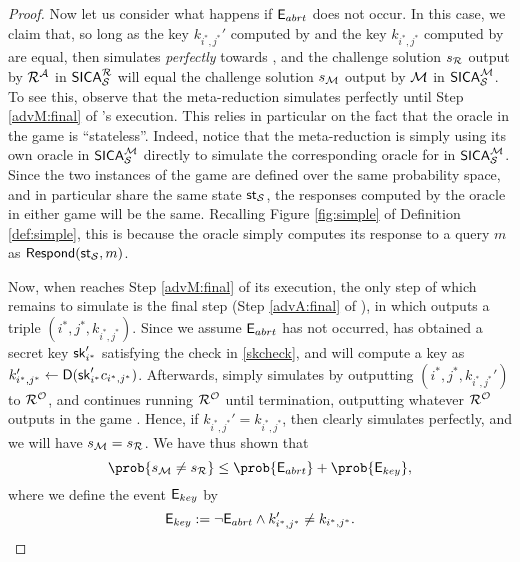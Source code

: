 \begin{proof}
  Now let us consider what happens if \(\mathsf{E}_{abrt}\) does not occur.
  In this case, we claim that, so long as the key
  \(k_{i^{*},j^{*}}'\) computed by \redM
  and the key \(k_{i^{*},j^{*}}\) computed by \advA
  are equal,
  then \redM simulates \advA \emph{perfectly}
  towards \redR,
  and the challenge solution \(s_{\redR}\) output by \(\redR^{\advA}\) in \(\SICA_{\Simple}^{\redR}\)
  will equal the challenge solution \(s_{\mathcal{M}}\) output by \(\mathcal{M}\)
  in \(\mathsf{SICA}_{\mathcal{S}}^{\mathcal{M}}\).
  To see this, observe that the meta-reduction \redM simulates \advA
  perfectly until Step \ref{advM:final} of \redM's execution.
  This relies in particular on the fact that the oracle \oracle
  in the \SICA game is ``stateless''.
  Indeed, notice that the meta-reduction \redM is simply
  using its own oracle \oracle in \(\mathsf{SICA}_{\mathcal{S}}^{\mathcal{M}}\)
  directly to simulate the corresponding oracle for \redR in \(\mathsf{SICA}_{\mathcal{S}}^{\mathcal{M}}\).
  Since the two instances of the \SICA game are defined over the same probability space,
  and in particular share the same state \(\mathsf{st}_{\mathcal{S}}\),
  the responses computed by the oracle \oracle
  in either game will be the same.
  Recalling Figure \ref{fig:simple} of Definition \ref{def:simple},
  this is because the oracle \oracle simply computes its response to a query \(m\)
  as \(\mathsf{Respond}(\mathsf{st}_{\mathcal{S}},m)\).

  Now, when \redM reaches Step \ref{advM:final} of its execution,
  the only step of \advA which remains to simulate is the
  final step (Step \ref{advA:final} of \advA), in which \advA outputs
  a triple \((i^{*},j^{*},k_{i^{*},j^{*}})\).
  Since we assume \(\mathsf{E}_{abrt}\) has not occurred,
  \redM has obtained a secret key \(\mathsf{sk}_{i^{*}}'\)
  satisfying the check in \eqref{skcheck},
  and will compute a key as \(k_{i^{*},{j^{*}}}' \leftarrow \mathsf{D}(\mathsf{sk}_{i^{*}}'c_{i^{*},j^{*}})\).
  Afterwards, \redM simply simulates \advA
  by outputting \((i^{*},j^{*}, k_{i^{*},j^{*}}')\) to \(\redR^{\oracle}\),
  and continues running \(\redR^{\oracle}\)
  until termination, outputting whatever \(\redR^{\oracle}\)
  outputs in the game \SICA.
  Hence, if \(k_{i^{*},j^{*}}' = k_{i^{*},j^{*}}\),
  then clearly \redM simulates \advA perfectly,
  and we will have \(s_{\redM} = s_{\redR}\).
  We have thus shown that
  \[
    \prob{s_{\redM} \ne s_{\redR}} \le \prob{\eventE_{abrt}} + \prob{\eventE_{key}},
  \]
  where we define the event \(\mathsf{E}_{key}\) by
  \[
    \mathsf{E}_{key} := \neg \mathsf{E}_{abrt} \land k_{i^{*},j^{*}}' \ne k_{i^{*},j^{*}}.
  \]


\end{proof}
